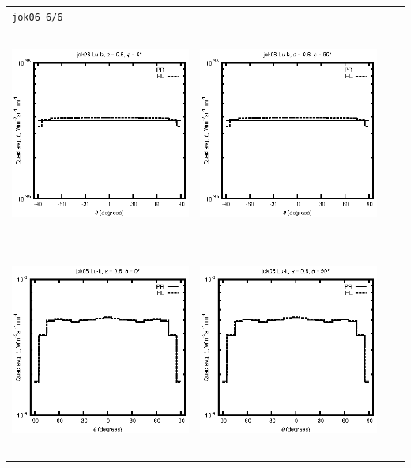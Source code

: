 \begin{tabular}{c c c c}
\multicolumn{4}{l}{\texttt{jok06 6/6}} \\
\includegraphics[height=7cm]{../eps/jok06_Lu_b_fwd.eps} &
\includegraphics[height=7cm]{../eps/jok06_Lu_b_cross.eps} \\
\includegraphics[height=7cm]{../eps/jok06_Lu_it_fwd.eps} &
\includegraphics[height=7cm]{../eps/jok06_Lu_it_cross.eps} \\

\end{tabular}
